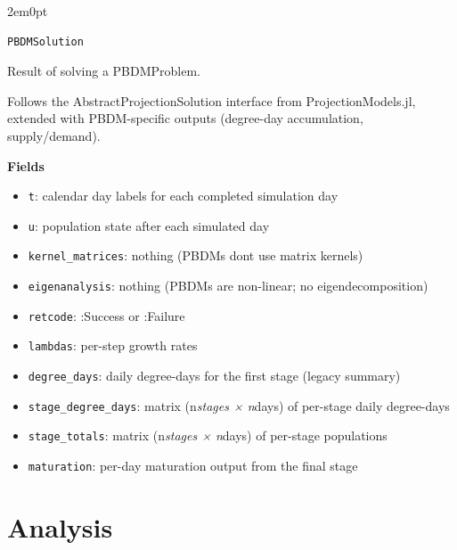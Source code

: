 \begin{adjustwidth}{2em}{0pt}


\begin{verbatim}
PBDMSolution
\end{verbatim}

Result of solving a PBDMProblem.

Follows the AbstractProjectionSolution interface from ProjectionModels.jl, extended with PBDM-specific outputs (degree-day accumulation, supply/demand).

\textbf{Fields}

\begin{itemize}
\item \texttt{t}: calendar day labels for each completed simulation day


\item \texttt{u}: population state after each simulated day


\item \texttt{kernel\_matrices}: nothing (PBDMs don{\textquotesingle}t use matrix kernels)


\item \texttt{eigenanalysis}: nothing (PBDMs are non-linear; no eigendecomposition)


\item \texttt{retcode}: :Success or :Failure


\item \texttt{lambdas}: per-step growth rates


\item \texttt{degree\_days}: daily degree-days for the first stage (legacy summary)


\item \texttt{stage\_degree\_days}: matrix (n\emph{stages × n}days) of per-stage daily degree-days


\item \texttt{stage\_totals}: matrix (n\emph{stages × n}days) of per-stage populations


\item \texttt{maturation}: per-day maturation output from the final stage

\end{itemize}


\end{adjustwidth}

\chapter{Analysis}


